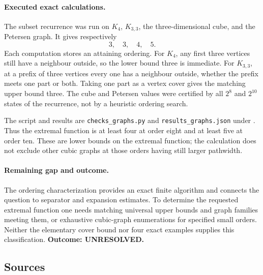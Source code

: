 \documentclass[11pt,a4paper]{article}
\begin{document}
\paragraph{Executed exact calculations.}
The subset recurrence was run on $K_4$, $K_{3,3}$, the three-dimensional
cube, and the Petersen graph. It gives respectively
\[
                         3,\quad3,\quad4,\quad5.
\]
Each computation stores an attaining ordering. For $K_4$, any first
three vertices still have a neighbour outside, so the lower bound three
is immediate. For $K_{3,3}$, at a prefix of three vertices every one
has a neighbour outside, whether the prefix meets one part or both.
Taking one part as a vertex cover gives the matching upper bound three.
The cube and Petersen values were certified by all $2^8$ and $2^{10}$
states of the recurrence, not by a heuristic ordering search.

The script and results are \texttt{checks\_graphs.py} and
\texttt{results\_graphs.json} under
.
Thus the extremal function is at least four at order eight and at
least five at order ten. These are lower bounds on the extremal
function; the calculation does not exclude other cubic graphs at
those orders having still larger pathwidth.

\paragraph{Remaining gap and outcome.}
The ordering characterization provides an exact finite algorithm and
connects the question to separator and expansion estimates. To determine
the requested extremal function one needs matching universal upper
bounds and graph families meeting them, or exhaustive cubic-graph
enumerations for specified small orders. Neither the elementary cover
bound nor four exact examples supplies this classification.
\textbf{Outcome: UNRESOLVED.}

\subsection{Sources}
\end{document}

